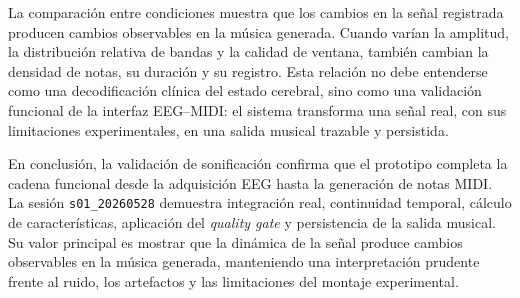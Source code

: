 \clearpage
La comparación entre condiciones muestra que los cambios en la señal registrada producen cambios observables en la música generada. Cuando varían la amplitud, la distribución relativa de bandas y la calidad de ventana, también cambian la densidad de notas, su duración y su registro. Esta relación no debe entenderse como una decodificación clínica del estado cerebral, sino como una validación funcional de la interfaz EEG--MIDI: el sistema transforma una señal real, con sus limitaciones experimentales, en una salida musical trazable y persistida.

En conclusión, la validación de sonificación confirma que el prototipo completa la cadena funcional desde la adquisición EEG hasta la generación de notas MIDI. La sesión \texttt{s01\_20260528} demuestra integración real, continuidad temporal, cálculo de características, aplicación del \textit{quality gate} y persistencia de la salida musical. Su valor principal es mostrar que la dinámica de la señal produce cambios observables en la música generada, manteniendo una interpretación prudente frente al ruido, los artefactos y las limitaciones del montaje experimental.
